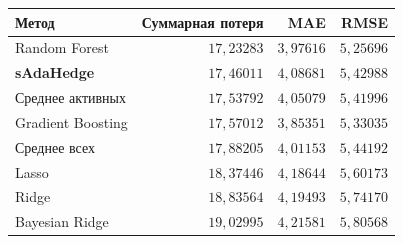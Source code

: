 \begin{tabular}{@{}lrrr@{}}
\toprule
Метод & Суммарная потеря & MAE & RMSE \\
\midrule
Random Forest & $17{,}23283$ & $3{,}97616$ & $5{,}25696$ \\
\textbf{sAdaHedge} & \boldmath $17{,}46011$ & \boldmath $4{,}08681$ & \boldmath $5{,}42988$ \\
Среднее активных & $17{,}53792$ & $4{,}05079$ & $5{,}41996$ \\
Gradient Boosting & $17{,}57012$ & $3{,}85351$ & $5{,}33035$ \\
Среднее всех & $17{,}88205$ & $4{,}01153$ & $5{,}44192$ \\
Lasso & $18{,}37446$ & $4{,}18644$ & $5{,}60173$ \\
Ridge & $18{,}83564$ & $4{,}19493$ & $5{,}74170$ \\
Bayesian Ridge & $19{,}02995$ & $4{,}21581$ & $5{,}80568$ \\
\bottomrule
\end{tabular}
